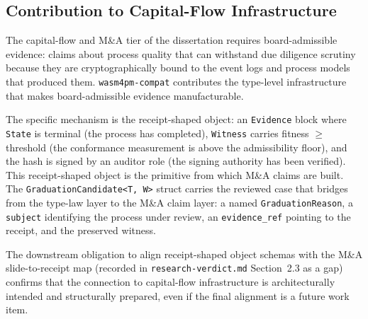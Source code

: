 \subsection{Contribution to Capital-Flow Infrastructure}
\label{sec:sources-wasm4pm-compat-contribution-capital}

The capital-flow and M\&A tier of the dissertation requires board-admissible evidence:
claims about process quality that can withstand due diligence scrutiny because they are
cryptographically bound to the event logs and process models that produced them.
\texttt{wasm4pm-compat} contributes the type-level infrastructure that makes
board-admissible evidence manufacturable.

The specific mechanism is the receipt-shaped object: an \texttt{Evidence} block where
\texttt{State} is terminal (the process has completed), \texttt{Witness} carries fitness
$\geq$ threshold (the conformance measurement is above the admissibility floor), and the
hash is signed by an auditor role (the signing authority has been verified). This
receipt-shaped object is the primitive from which M\&A claims are built. The
\texttt{GraduationCandidate<T, W>} struct carries the reviewed case that bridges from
the type-law layer to the M\&A claim layer: a named \texttt{GraduationReason}, a
\texttt{subject} identifying the process under review, an \texttt{evidence\_ref} pointing
to the receipt, and the preserved witness.

The downstream obligation to align receipt-shaped object schemas with the M\&A slide-to-receipt
map (recorded in \texttt{research-verdict.md} Section~2.3 as a gap) confirms that the
connection to capital-flow infrastructure is architecturally intended and structurally
prepared, even if the final alignment is a future work item.
